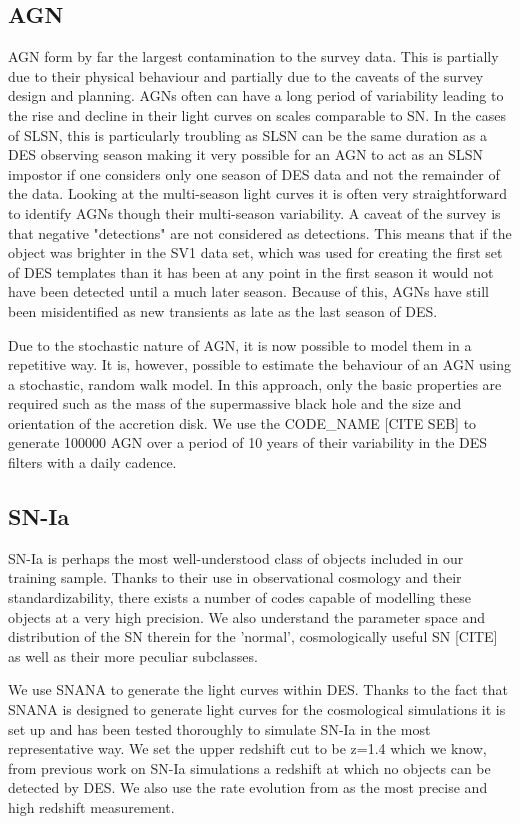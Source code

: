 \subsection{AGN}
AGN form by far the largest contamination to the survey data. This is partially due to their physical behaviour and partially due to the caveats of the survey design and planning. AGNs often can have a long period of variability leading to the rise and decline in their light curves on scales comparable to SN. In the cases of SLSN, this is particularly troubling as SLSN can be the same duration as a DES observing season making it very possible for an AGN to act as an SLSN impostor if one considers only one season of DES data and not the remainder of the data. Looking at the multi-season light curves it is often very straightforward to identify AGNs though their multi-season variability. A caveat of the survey is that negative "detections" are not considered as detections. This means that if the object was brighter in the SV1 data set, which was used for creating the first set of DES templates than it has been at any point in the first season it would not have been detected until a much later season. Because of this, AGNs have still been misidentified as new transients as late as the last season of DES.

Due to the stochastic nature of AGN, it is now possible to model them in a repetitive way. It is, however, possible to estimate the behaviour of an AGN using a stochastic, random walk model. In this approach, only the basic properties are required such as the mass of the supermassive black hole and the size and orientation of the accretion disk. We use the CODE\_NAME [CITE SEB] to generate 100000 AGN over a period of 10 years of their variability in the DES filters with a daily cadence.

\subsection{SN-Ia}
SN-Ia is perhaps the most well-understood class of objects included in our training sample. Thanks to their use in observational cosmology and their standardizability, there exists a number of codes capable of modelling these objects at a very high precision. We also understand the parameter space and distribution of the SN therein for the 'normal', cosmologically useful SN [CITE] as well as their more peculiar subclasses.

We use SNANA \citep{Kessler2010} to generate the light curves within DES. Thanks to the fact that SNANA is designed to generate light curves for the cosmological simulations it is set up and has been tested thoroughly to simulate SN-Ia in the most representative way. We set the upper redshift cut to be z=1.4 which we know, from previous work on SN-Ia simulations a redshift at which no objects can be detected by DES. We also use the rate evolution from \citet{Perrett2012} as the most precise and high redshift measurement.

